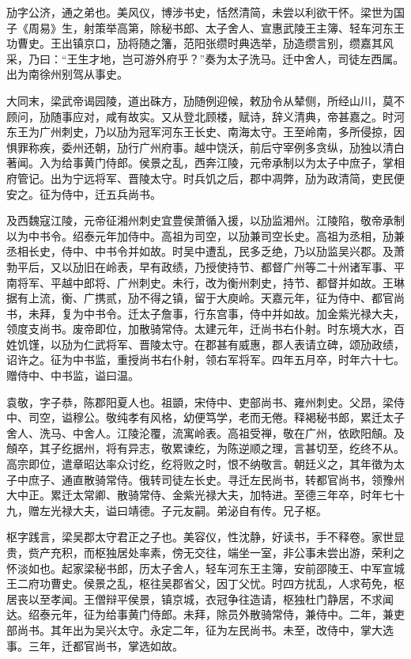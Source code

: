 \documentclass[]{article}
\begin{document}
劢字公济，通之弟也。美风仪，博涉书史，恬然清简，未尝以利欲干怀。梁世为国子《周易》生，射策举高第，除秘书郎、太子舍人、宣惠武陵王主簿、轻车河东王功曹史。王出镇京口，劢将随之籓，范阳张缵时典选举，劢造缵言别，缵嘉其风采，乃曰：``王生才地，岂可游外府乎？''奏为太子洗马。迁中舍人，司徒左西属。出为南徐州别驾从事史。

大同末，梁武帝谒园陵，道出硃方，劢随例迎候，敕劢令从辇侧，所经山川，莫不顾问，劢随事应对，咸有故实。又从登北顾楼，赋诗，辞义清典，帝甚嘉之。时河东王为广州刺史，乃以劢为冠军河东王长史、南海太守。王至岭南，多所侵掠，因惧罪称疾，委州还朝，劢行广州府事。越中饶沃，前后守宰例多贪纵，劢独以清白著闻。入为给事黄门侍郎。侯景之乱，西奔江陵，元帝承制以为太子中庶子，掌相府管记。出为宁远将军、晋陵太守。时兵饥之后，郡中凋弊，劢为政清简，吏民便安之。征为侍中，迁五兵尚书。

及西魏寇江陵，元帝征湘州刺史宜豊侯萧循入援，以劢监湘州。江陵陷，敬帝承制以为中书令。绍泰元年加侍中。高祖为司空，以劢兼司空长史。高祖为丞相，劢兼丞相长史，侍中、中书令并如故。时吴中遭乱，民多乏绝，乃以劢监吴兴郡。及萧勃平后，又以劢旧在岭表，早有政绩，乃授使持节、都督广州等二十州诸军事、平南将军、平越中郎将、广州刺史。未行，改为衡州刺史，持节、都督并如故。王琳据有上流，衡、广携贰，劢不得之镇，留于大庾岭。天嘉元年，征为侍中、都官尚书，未拜，复为中书令。迁太子詹事，行东宫事，侍中并如故。加金紫光禄大夫，领度支尚书。废帝即位，加散骑常侍。太建元年，迁尚书右仆射。时东境大水，百姓饥馑，以劢为仁武将军、晋陵太守。在郡甚有威惠，郡人表请立碑，颂劢政绩，诏许之。征为中书监，重授尚书右仆射，领右军将军。四年五月卒，时年六十七。赠侍中、中书监，谥曰温。

袁敬，字子恭，陈郡阳夏人也。祖顗，宋侍中、吏部尚书、雍州刺史。父昂，梁侍中、司空，谥穆公。敬纯孝有风格，幼便笃学，老而无倦。释褐秘书郎，累迁太子舍人、洗马、中舍人。江陵沦覆，流寓岭表。高祖受禅，敬在广州，依欧阳頠。及頠卒，其子纥据州，将有异志，敬累谏纥，为陈逆顺之理，言甚切至，纥终不从。高宗即位，遣章昭达率众讨纥，纥将败之时，恨不纳敬言。朝廷义之，其年徵为太子中庶子、通直散骑常侍。俄转司徒左长史。寻迁左民尚书，转都官尚书，领豫州大中正。累迁太常卿、散骑常侍、金紫光禄大夫，加特进。至德三年卒，时年七十九，赠左光禄大夫，谥曰靖德。子元友嗣。弟泌自有传。兄子枢。

枢字践言，梁吴郡太守君正之子也。美容仪，性沈静，好读书，手不释卷。家世显贵，赀产充积，而枢独居处率素，傍无交往，端坐一室，非公事未尝出游，荣利之怀淡如也。起家梁秘书郎，历太子舍人，轻车河东王主簿，安前邵陵王、中军宣城王二府功曹史。侯景之乱，枢往吴郡省父，因丁父忧。时四方扰乱，人求苟免，枢居丧以至孝闻。王僧辩平侯景，镇京城，衣冠争往造请，枢独杜门静居，不求闻达。绍泰元年，征为给事黄门侍郎。未拜，除员外散骑常侍，兼侍中。二年，兼吏部尚书。其年出为吴兴太守。永定二年，征为左民尚书。未至，改侍中，掌大选事。三年，迁都官尚书，掌选如故。
\end{document}
